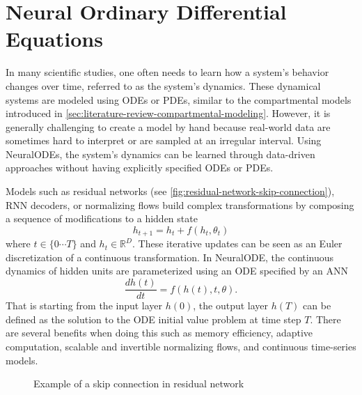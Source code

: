 \section{Neural Ordinary Differential Equations}

In many scientific studies, one often needs to learn how a system's behavior changes over time, referred to as the system's dynamics.
These dynamical systems are modeled using \glspl{ODE} or \glspl{PDE}, similar to the compartmental models introduced in \autoref{sec:literature-review-compartmental-modeling}.
However, it is generally challenging to create a model by hand because real-world data are sometimes hard to interpret or are sampled at an irregular interval.
Using \glspl{NeuralODE}, the system's dynamics can be learned through data-driven approaches without having explicitly specified \glspl{ODE} or \glspl{PDE}.

Models such as residual networks (see \autoref{fig:residual-network-skip-connection}), \gls{RNN} decoders, or normalizing flows build complex transformations by composing a sequence of modifications to a hidden state \cite{chenNeuralOrdinaryDifferential2019}
\begin{equation*}
    h_{t+1} = h_t + f(h_t, \theta_t)
\end{equation*}
where $t \in \{0 \cdots T\}$ and $h_t \in \mathbb{R}^D$.
These iterative updates can be seen as an Euler discretization of a continuous transformation.
In \gls{NeuralODE}, the continuous dynamics of hidden units are parameterized using an \gls{ODE} specified by an \gls{ANN}
\begin{equation*}
    \frac{dh(t)}{dt} = f(h(t), t, \theta).
\end{equation*}
That is starting from the input layer $h(0)$, the output layer $h(T)$ can be defined as the solution to the \gls{ODE} initial value problem at time step $T$.
There are several benefits when doing this such as memory efficiency, adaptive computation, scalable and invertible normalizing flows, and continuous time-series models.

\begin{figure}
    \centering
    \caption{Example of a skip connection in residual network}
    \label{fig:residual-network-skip-connection}
\end{figure}

